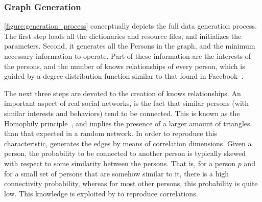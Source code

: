 \subsubsection{Graph Generation}




\autoref{figure:generation_process} conceptually depicts the full data
generation process. The first step loads all the dictionaries and resource
files, and initializes the \datagen parameters.  Second, it generates all the
Persons in the graph, and the minimum necessary information to operate. Part of
these information are the interests of the persons, and the number of knows
relationships of every person, which is guided by a degree distribution
function similar to that found in Facebook~\cite{facebook_anatomy}.

The next three steps are devoted to the creation of knows relationships.  An
important aspect of real social networks, is the fact that similar persons
(with similar interests and behaviors) tend to be connected. This is known as
the Homophily principle~\cite{mcpherson2001birds,DBLP:journals/socnet/BaroneC18}, and implies the presence of
a larger amount of triangles than that expected in a random network. In order
to reproduce this characteristic, \datagen generates the edges by means of
correlation dimensions.  Given a person, the probability to be connected to
another person is typically skewed with respect to some similarity between the
persons. That is, for a person $p$ and for a small set of persons that are
somehow similar to it, there is a high connectivity probability, whereas for
most other persons, this probability is quite low. This knowledge is
exploited by \datagen to reproduce correlations.


